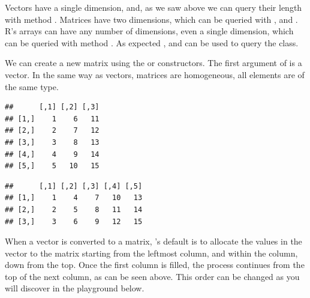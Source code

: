 \documentclass[krantz2]{krantz}\usepackage{knitr}%
\begin{document}
Vectors have a single dimension, and, as we saw above we can query their length with method . Matrices have two dimensions, which can be queried with ,  and . R's arrays can have any number of dimensions, even a single dimension, which can be queried with method . As expected ,  and  can be used to query the class.

We can create a new matrix using the  or  constructors. The first argument of  is a vector. In the same way as vectors, matrices are homogeneous, all elements are of the same type.

\begin{knitrout}\footnotesize
{}\color{fgcolor}\begin{kframe}
\begin{alltt}
\hlstd{(}\hlopt{:}\hlstd{,}  \hlstd{=} \hlstd{)}
\end{alltt}
\begin{verbatim}
##      [,1] [,2] [,3]
## [1,]    1    6   11
## [2,]    2    7   12
## [3,]    3    8   13
## [4,]    4    9   14
## [5,]    5   10   15
\end{verbatim}
\begin{alltt}
\hlstd{(}\hlopt{:}\hlstd{,}  \hlstd{=} \hlstd{)}
\end{alltt}
\begin{verbatim}
##      [,1] [,2] [,3] [,4] [,5]
## [1,]    1    4    7   10   13
## [2,]    2    5    8   11   14
## [3,]    3    6    9   12   15
\end{verbatim}
\end{kframe}
\end{knitrout}

When a vector is converted to a matrix, \Rlang's default is to allocate the values in the vector to the matrix starting from the leftmost column, and within the column, down from the top. Once the first column is filled, the process continues from the top of the next column, as can be seen above. This order can be changed as you will discover in the playground below.
\end{document}
